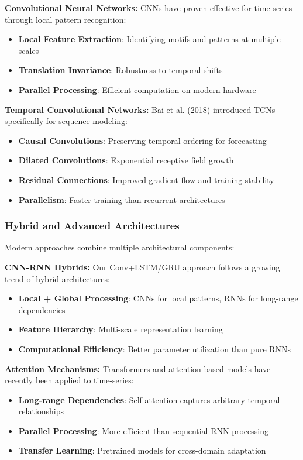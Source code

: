 \documentclass[conference]{IEEEtran}
\begin{document}
\textbf{Convolutional Neural Networks:}
CNNs have proven effective for time-series through local pattern recognition:
\begin{itemize}
  \item \textbf{Local Feature Extraction}: Identifying motifs and patterns at multiple scales
  \item \textbf{Translation Invariance}: Robustness to temporal shifts
  \item \textbf{Parallel Processing}: Efficient computation on modern hardware
\end{itemize}

\textbf{Temporal Convolutional Networks:}
Bai et al. (2018) introduced TCNs specifically for sequence modeling:
\begin{itemize}
  \item \textbf{Causal Convolutions}: Preserving temporal ordering for forecasting
  \item \textbf{Dilated Convolutions}: Exponential receptive field growth
  \item \textbf{Residual Connections}: Improved gradient flow and training stability
  \item \textbf{Parallelism}: Faster training than recurrent architectures
\end{itemize}

\subsubsection{Hybrid and Advanced Architectures}
Modern approaches combine multiple architectural components:

\textbf{CNN-RNN Hybrids:}
Our Conv+LSTM/GRU approach follows a growing trend of hybrid architectures:
\begin{itemize}
  \item \textbf{Local + Global Processing}: CNNs for local patterns, RNNs for long-range dependencies
  \item \textbf{Feature Hierarchy}: Multi-scale representation learning
  \item \textbf{Computational Efficiency}: Better parameter utilization than pure RNNs
\end{itemize}

\textbf{Attention Mechanisms:}
Transformers and attention-based models have recently been applied to time-series:
\begin{itemize}
  \item \textbf{Long-range Dependencies}: Self-attention captures arbitrary temporal relationships
  \item \textbf{Parallel Processing}: More efficient than sequential RNN processing
  \item \textbf{Transfer Learning}: Pretrained models for cross-domain adaptation
\end{itemize}
\end{document}

